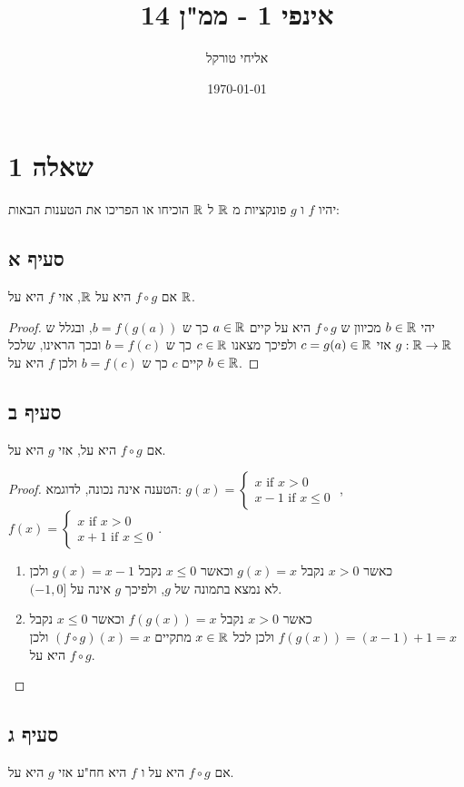 \documentclass{article}
\title{אינפי 1 - ממ"ן 14}
\author{אליחי טורקל \ID}
\date\today
\begin{document}
	\maketitle %

	\section*{שאלה 1}
	יהיו $f$ ו $g$ פונקציות מ $\mathbb{R}$ ל $\mathbb{R}$ הוכיחו או הפריכו את הטענות הבאות:
	\subsection*{סעיף א}
	אם $f \circ g$ היא על $\mathbb{R}$, אזי $f$ היא על $\mathbb{R}$.
	\begin{proof}
		יהי $b \in \mathbb{R}$ מכיוון ש $f \circ g$ היא על קיים $a \in \mathbb{R}$ כך ש $b = f(g(a))$, ובגלל ש $g: \mathbb{R} \to \mathbb{R}$ אזי $c = g(a) \in \mathbb{R}$ ולפיכך מצאנו $c \in \mathbb{R}$ כך ש $b = f(c)$ ובכך הראינו, שלכל $b \in \mathbb{R}$ קיים $c$ כך ש $b = f(c)$ ולכן $f$ היא על.
	\end{proof}

	\subsection*{סעיף ב}
	אם $f \circ g$ היא על, אזי $g$ היא על.
	\begin{proof} \nl
		הטענה אינה נכונה, לדוגמא:
		$g(x) = \begin{cases}
			x \text{  if } x > 0 \\
			x-1 \text{  if } x \leq 0
		\end{cases}$ ,
		$f(x) = \begin{cases}
			x \text{  if } x > 0 \\
			x + 1 \text{ if } x \leq 0
		\end{cases}$. \\
	\begin{enumerate}
		\item כאשר $x > 0$ נקבל $g(x) = x$ וכאשר $x \leq 0$ נקבל $g(x) = x-1$ ולכן \\
		$(-1, 0]$ לא נמצא בתמונה של $g$, ולפיכך $g$ אינה על.
		\item כאשר $x > 0$ נקבל $f(g(x)) = x$ וכאשר $x \leq 0$ נקבל $f(g(x)) = (x - 1) + 1 = x$ ולכן לכל $x \in \mathbb{R}$ מתקיים $(f \circ g)(x) = x$ ולכן $f \circ g$ היא על.
	\end{enumerate}
	\end{proof}

	\subsection*{סעיף ג}
	אם $f \circ g$ היא על ו $f$ היא חח"ע אזי $g$ היא על.
\end{document}
